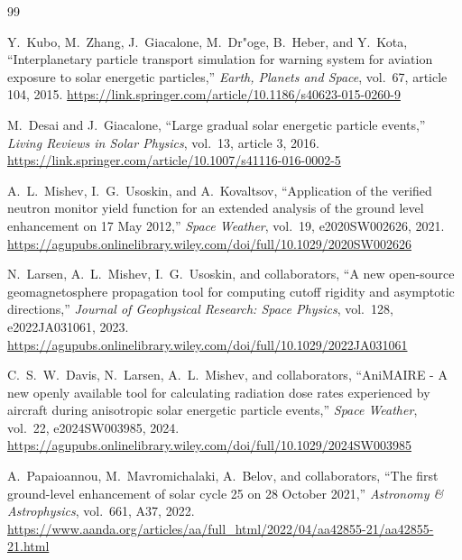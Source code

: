 \documentclass[11pt]{article}
\begin{document}
\begin{thebibliography}{99}

Y.~Kubo, M.~Zhang, J.~Giacalone, M.~Dr"oge, B.~Heber, and Y.~Kota,
``Interplanetary particle transport simulation for warning system for aviation exposure to solar energetic particles,''
\emph{Earth, Planets and Space}, vol.~67, article 104, 2015.
\url{https://link.springer.com/article/10.1186/s40623-015-0260-9}

M.~Desai and J.~Giacalone,
``Large gradual solar energetic particle events,''
\emph{Living Reviews in Solar Physics}, vol.~13, article 3, 2016.
\url{https://link.springer.com/article/10.1007/s41116-016-0002-5}

A.~L.~Mishev, I.~G.~Usoskin, and A.~Kovaltsov,
``Application of the verified neutron monitor yield function for an extended analysis of the ground level enhancement on 17 May 2012,''
\emph{Space Weather}, vol.~19, e2020SW002626, 2021.
\url{https://agupubs.onlinelibrary.wiley.com/doi/full/10.1029/2020SW002626}

N.~Larsen, A.~L.~Mishev, I.~G.~Usoskin, and collaborators,
``A new open-source geomagnetosphere propagation tool for computing cutoff rigidity and asymptotic directions,''
\emph{Journal of Geophysical Research: Space Physics}, vol.~128, e2022JA031061, 2023.
\url{https://agupubs.onlinelibrary.wiley.com/doi/full/10.1029/2022JA031061}

C.~S.~W.~Davis, N.~Larsen, A.~L.~Mishev, and collaborators,
``AniMAIRE - A new openly available tool for calculating radiation dose rates experienced by aircraft during anisotropic solar energetic particle events,''
\emph{Space Weather}, vol.~22, e2024SW003985, 2024.
\url{https://agupubs.onlinelibrary.wiley.com/doi/full/10.1029/2024SW003985}

A.~Papaioannou, M.~Mavromichalaki, A.~Belov, and collaborators,
``The first ground-level enhancement of solar cycle 25 on 28 October 2021,''
\emph{Astronomy \& Astrophysics}, vol.~661, A37, 2022.
\url{https://www.aanda.org/articles/aa/full_html/2022/04/aa42855-21/aa42855-21.html}

\end{thebibliography}
\end{document}

